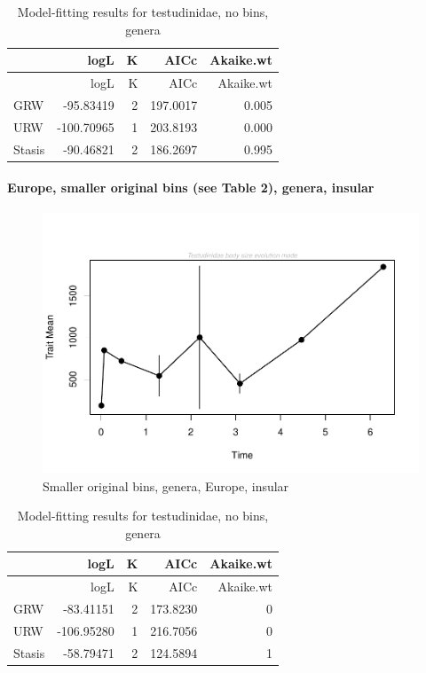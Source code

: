 \documentclass[]{article}
\let\oldparagraph\paragraph
\renewcommand{\paragraph}[1]{\oldparagraph{#1}\mbox{}}
\begin{document}
\begin{longtable}[]{@{}lrrrr@{}}
\caption{Model-fitting results for testudinidae, no bins,
genera}\tabularnewline
\toprule
& logL & K & AICc & Akaike.wt\tabularnewline
\midrule
\endfirsthead
\toprule
& logL & K & AICc & Akaike.wt\tabularnewline
\midrule
\endhead
GRW & -95.83419 & 2 & 197.0017 & 0.005\tabularnewline
URW & -100.70965 & 1 & 203.8193 & 0.000\tabularnewline
Stasis & -90.46821 & 2 & 186.2697 & 0.995\tabularnewline
\bottomrule
\end{longtable}

\newpage

\paragraph{Europe, smaller original bins (see Table 2), genera,
insular}\label{europe-smaller-original-bins-see-table-2-genera-insular}

\begin{figure}[htbp]
\centering
\includegraphics{MA_JJ_files/figure-latex/paleoTS with different time bins, no bins, genera, Europe, insular-1.pdf}
\caption{Smaller original bins, genera, Europe, insular}
\end{figure}

\begin{longtable}[]{@{}lrrrr@{}}
\caption{Model-fitting results for testudinidae, no bins,
genera}\tabularnewline
\toprule
& logL & K & AICc & Akaike.wt\tabularnewline
\midrule
\endfirsthead
\toprule
& logL & K & AICc & Akaike.wt\tabularnewline
\midrule
\endhead
GRW & -83.41151 & 2 & 173.8230 & 0\tabularnewline
URW & -106.95280 & 1 & 216.7056 & 0\tabularnewline
Stasis & -58.79471 & 2 & 124.5894 & 1\tabularnewline
\bottomrule
\end{longtable}
\end{document}
